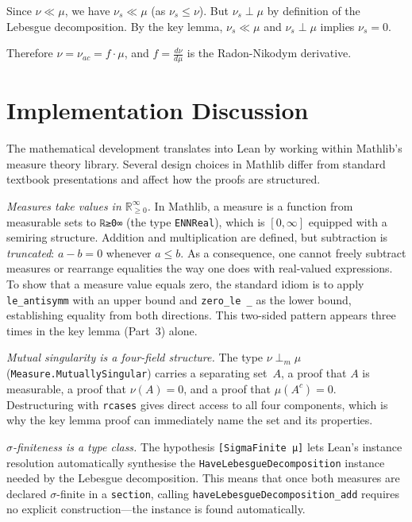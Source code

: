 \documentclass[11pt]{article}
\begin{document}
Since $\nu \ll \mu$, we have $\nu_s \ll \mu$ (as $\nu_s \leq \nu$). But $\nu_s \perp \mu$ by definition of the Lebesgue decomposition. By the key lemma, $\nu_s \ll \mu$ and $\nu_s \perp \mu$ implies $\nu_s = 0$.

Therefore $\nu = \nu_{ac} = f \cdot \mu$, and $f = \frac{d\nu}{d\mu}$ is the Radon-Nikodym derivative.

\section{Implementation Discussion}

\noindent
The mathematical development translates into Lean by working within Mathlib's measure theory library. Several design choices in Mathlib differ from standard textbook presentations and affect how the proofs are structured.

\emph{Measures take values in $\mathbb{R}_{\ge 0}^\infty$.} In Mathlib, a measure is a function from measurable sets to \texttt{ℝ≥0∞} (the type \texttt{ENNReal}), which is $[0,\infty]$ equipped with a semiring structure. Addition and multiplication are defined, but subtraction is \emph{truncated}: $a - b = 0$ whenever $a \le b$. As a consequence, one cannot freely subtract measures or rearrange equalities the way one does with real-valued expressions. To show that a measure value equals zero, the standard idiom is to apply \texttt{le\_antisymm} with an upper bound and \texttt{zero_le _} as the lower bound, establishing equality from both directions. This two-sided pattern appears three times in the key lemma (Part~3) alone.

\emph{Mutual singularity is a four-field structure.} The type $\nu \perp_m \mu$ (\texttt{Measure.MutuallySingular}) carries a separating set~$A$, a proof that $A$ is measurable, a proof that $\nu(A) = 0$, and a proof that $\mu(A^c) = 0$. Destructuring with \texttt{rcases} gives direct access to all four components, which is why the key lemma proof can immediately name the set and its properties.

\emph{$\sigma$-finiteness is a type class.} The hypothesis \texttt{[SigmaFinite μ]} lets Lean's instance resolution automatically synthesise the \texttt{HaveLebesgueDecomposition} instance needed by the Lebesgue decomposition. This means that once both measures are declared $\sigma$-finite in a \texttt{section}, calling \texttt{haveLebesgueDecomposition\_add} requires no explicit construction---the instance is found automatically.
\end{document}
